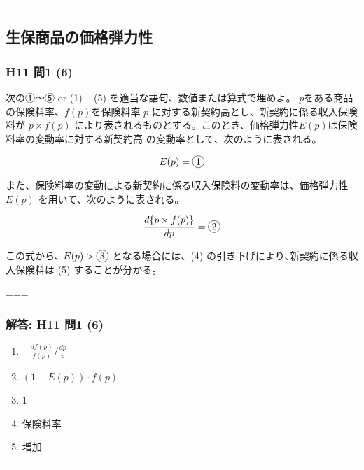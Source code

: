 \documentclass[]{article}
\begin{document}
\begin{center}\rule{0.5\linewidth}{0.5pt}\end{center}

\hypertarget{ux751fux4fddux5546ux54c1ux306eux4fa1ux683cux5f3eux529bux6027}{%
\subsection{生保商品の価格弾力性}\label{ux751fux4fddux5546ux54c1ux306eux4fa1ux683cux5f3eux529bux6027}}

\hypertarget{h11-ux554f1-6}{%
\subsubsection{H11 問1 (6)}\label{h11-ux554f1-6}}

次の①～⑤ or (1) -- (5) を適当な語句、数値または算式で埋めよ。
\(p\)をある商品の保険料率、\(f(p)\)を保険料率 \(p\)
に対する新契約高とし、新契約に係る収入保険料が \(p \times f(p)\)
により表されるものとする。このとき、価格弾力性\(E(p)\)は保険料率の変動率に対する新契約高
の変動率として、次のように表される。

\[E(p) =  \cir{1} \]

また、保険料率の変動による新契約に係る収入保険料の変動率は、価格弾力性
\(E(p)\) を用いて、次のように表される。

\[\frac{d\{p \times f(p)\} }{dp}= \cir{2}\]

この式から､ \(E(p) > \cir{3}\) となる場合には、(4)
の引き下げにより､新契約に係る収入保険料は (5) することが分かる。

===

\hypertarget{ux89e3ux7b54-h11-ux554f1-6}{%
\subsubsection{解答: H11 問1 (6)}\label{ux89e3ux7b54-h11-ux554f1-6}}

\begin{enumerate}
\def\labelenumi{(\arabic{enumi})}
\tightlist
\item
  \(-\frac{df(p)}{f(p)} / \frac{dp}{p}\)
\item
  \((1-E(p))\cdot f(p)\)
\item
  1
\item
  保険料率
\item
  増加
\end{enumerate}

\begin{center}\rule{0.5\linewidth}{0.5pt}\end{center}
\end{document}

